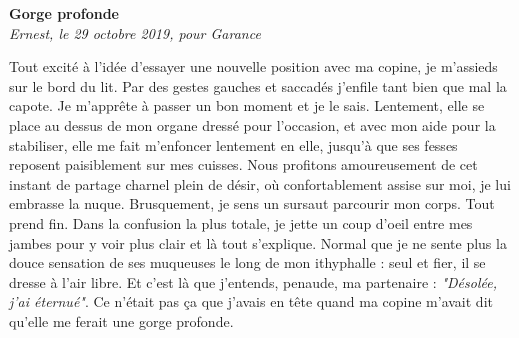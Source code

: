 \documentclass[french,12pt,amstex,a4paper]{article}
\begin{document}
\begin{center}
{\bf Gorge profonde}\\
{\it Ernest, le 29 octobre 2019, pour Garance}\\
\end{center}

 Tout excité à l'idée d'essayer une nouvelle position avec ma copine, je m'assieds sur le bord du lit. Par des gestes gauches et saccadés j'enfile tant bien que mal la capote. Je m'apprête à passer un bon moment et je le sais. Lentement, elle se place au dessus de mon organe dressé pour l'occasion, et avec mon aide pour la stabiliser, elle me fait m'enfoncer lentement en elle, jusqu'à que ses fesses reposent paisiblement sur mes cuisses. Nous profitons amoureusement de cet instant de partage charnel plein de désir, où confortablement assise sur moi, je lui embrasse la nuque. Brusquement, je sens un sursaut parcourir mon corps. Tout prend fin. Dans la confusion la plus totale, je jette un coup d'oeil entre mes jambes pour y voir plus clair et là tout s'explique. Normal que je ne sente plus la douce sensation de ses muqueuses le long de mon ithyphalle : seul et fier, il se dresse à l'air libre. Et c'est là que j'entends, penaude, ma partenaire : {\it"Désolée, j'ai éternué"}. Ce n'était pas ça que j'avais en tête quand ma copine m'avait dit qu'elle me ferait une gorge profonde.\\
\end{document}
